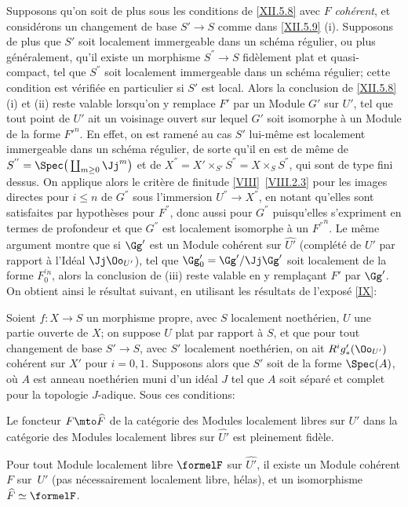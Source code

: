 \begin{remarque} \label{XII.5.9}
Supposons qu'on soit de plus sous les conditions de \ref{XII.5.8} avec $F$ \emph{cohérent}, et consid\'erons un changement de base $S'\to S$ comme dans \ref{XII.5.9} (i). Supposons de plus que $S'$ soit localement immergeable dans un sch\'ema r\'egulier, ou plus g\'en\'eralement, qu'il existe un morphisme $S^{''}\to S$ fid\`element plat et quasi-compact, tel que $S^{''}$ soit localement immergeable dans un sch\'ema r\'egulier; cette condition est v\'erifi\'ee en particulier si $S'$ est local. Alors la conclusion de \ref{XII.5.8} (i) et (ii) reste valable lorsqu'on y remplace $F'$ par un Module $G'$ sur $U'$, tel que tout point de $U'$ ait un voisinage ouvert sur lequel $G'$ soit isomorphe \`a un Module de la forme ${F'}^n$. En effet, on est ramen\'e au cas $S'$ lui-m\^eme est localement immergeable dans un sch\'ema r\'egulier, de sorte qu'il en est de m\^eme de $S^{''}=\Spec\big(\coprod_{m\geq 0}\Jj^m\big)$ et de $X^{''}=X'\times_{S'} S^{''}= X\times_{S} S^{''}$, qui sont de type fini dessus. On applique alors le crit\`ere de finitude \ref{VIII}~\ref{VIII.2.3} pour les images directes pour $i\leq n$ de $G^{''}$ sous l'immersion $U^{''}\to X^{''}$, en notant qu'elles sont satisfaites par hypoth\`eses pour $F^{''}$, donc aussi pour $G^{''}$ puisqu'elles s'expriment en termes de profondeur et que $G^{''}$ est localement isomorphe \`a un ${F^{''}}^n$. Le m\^eme argument montre que si $\Gg'$ est un Module coh\'erent sur $\widehat{U'}$ (compl\'et\'e de $U'$ par rapport \`a l'Id\'eal $\Jj\Oo_{U'}$), tel que $\Gg'_0=\Gg'/\Jj\Gg'$ soit localement de la forme $F_0^{'n}$, alors la conclusion de (iii) reste valable en y rempla\c cant $F'$ par $\Gg'$. On obtient ainsi le r\'esultat suivant, en utilisant les r\'esultats de l'expos\'e \ref{IX}:
\end{remarque}

\begin{corollaire} \label{XII.5.10}
Soient $f:X\to S$ un morphisme propre, avec $S$ localement noeth\'erien, $U$ une partie ouverte de $X$; on suppose $U$ plat par rapport \`a $S$, et que pour tout changement de base $S'\to S$, avec $S'$ localement noeth\'erien, on ait $R^ig'_\ast(\Oo_{U'})$ coh\'erent sur $X'$ pour $i=0, 1$. Supposons alors que $S'$ soit de la forme $\Spec(A)$, o\`u $A$ est anneau noeth\'erien muni d'un id\'eal $J$ tel que $A$ soit s\'epar\'e et complet pour la topologie $J$-adique. Sous ces conditions:
\begin{enumeratei}
\item
Le foncteur $F\mto\widehat{F}$ de la cat\'egorie des Modules localement libres sur $U'$ dans la cat\'egorie des Modules localement libres sur $\widehat{U'}$ est pleinement fid\`ele.
\item
Pour tout Module localement libre $\formelF$ sur $\widehat{U'}$, il existe un Module coh\'erent $F$ sur~$U'$ (pas n\'ecessairement localement libre, h\'elas), et un isomorphisme $\widehat{F}\simeq \formelF$.
\end{enumeratei}
\end{corollaire}

